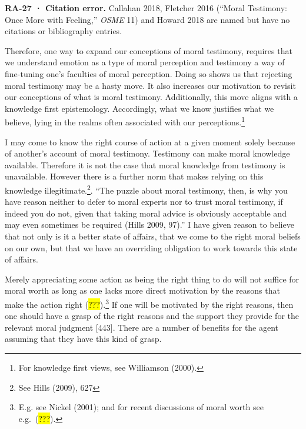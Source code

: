 \documentclass[
  letterpaper,
  DIV=11,
  numbers=noendperiod]{scrartcl}
\theoremstyle{remark}
\begin{document}
\begin{tcolorbox}[enhanced jigsaw, arc=.35mm, bottomrule=.15mm, bottomtitle=1mm, breakable, colback=white, colbacktitle=quarto-callout-warning-color!10!white, colframe=quarto-callout-warning-color-frame, coltitle=black, left=2mm, leftrule=.75mm, opacityback=0, opacitybacktitle=0.6, rightrule=.15mm, title=\textcolor{quarto-callout-warning-color}{\faExclamationTriangle}\hspace{0.5em}{Warning}, titlerule=0mm, toprule=.15mm, toptitle=1mm]

\textbf{RA-27 · Citation error.} Callahan 2018, Fletcher 2016 (``Moral
Testimony: Once More with Feeling,'' \emph{OSME} 11) and Howard 2018 are
named but have no citations or bibliography entries.

\end{tcolorbox}

Therefore, one way to expand our conceptions of moral testimony,
requires that we understand emotion as a type of moral perception and
testimony a way of fine-tuning one's faculties of moral perception.
Doing so shows us that rejecting moral testimony may be a hasty move. It
also increases our motivation to revisit our conceptions of what is
moral testimony. Additionally, this move aligns with a knowledge first
epistemology. Accordingly, what we know justifies what we believe, lying
in the realms often associated with our perceptions.\footnote{For
  knowledge first views, see Williamson (2000).}

I may come to know the right course of action at a given moment solely
because of another's account of moral testimony. Testimony can make
moral knowledge available. Therefore it is not the case that moral
knowledge from testimony is unavailable. However there is a further norm
that makes relying on this knowledge illegitimate.\footnote{See Hills
  (2009), 627}. ``The puzzle about moral testimony, then, is why you
have reason neither to defer to moral experts nor to trust moral
testimony, if indeed you do not, given that taking moral advice is
obviously acceptable and may even sometimes be required (Hills 2009,
97).'' I have given reason to believe that not only is it a better state
of affairs, that we come to the right moral beliefs on our own, but that
we have an overriding obligation to work towards this state of affairs.

Merely appreciating some action as being the right thing to do will not
suffice for moral worth as long as one lacks more direct motivation by
the reasons that make the action right (\hl{???}).\footnote{E.g. see
  Nickel (2001); and for recent discussions of moral worth see
  e.g.~(\hl{???}).} If one will be motivated by the right reasons, then
one should have a grasp of the right reasons and the support they
provide for the relevant moral judgment {[}443{]}. There are a number of
benefits for the agent assuming that they have this kind of grasp.
\end{document}
